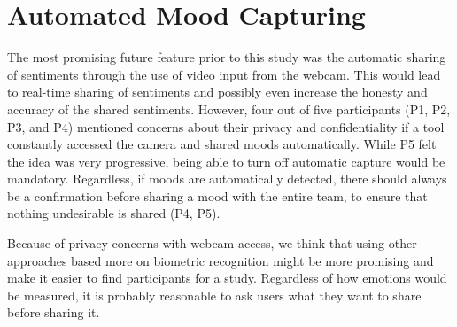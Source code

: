 \section{Automated Mood Capturing}
The most promising future feature prior to this study was the automatic sharing of sentiments through the use of video input from the webcam. This would lead to real-time sharing of sentiments and possibly even increase the honesty and accuracy of the shared sentiments. However, four out of five participants (P1, P2, P3, and P4) mentioned concerns about their privacy and confidentiality if a tool constantly accessed the camera and shared moods automatically. While P5 felt the idea was very progressive, being able to turn off automatic capture would be mandatory. Regardless, if moods are automatically detected, there should always be a confirmation before sharing a mood with the entire team, to ensure that nothing undesirable is shared (P4, P5).

Because of privacy concerns with webcam access, we think that using other approaches based more on biometric recognition might be more promising and make it easier to find participants for a study. Regardless of how emotions would be measured, it is probably reasonable to ask users what they want to share before sharing it.